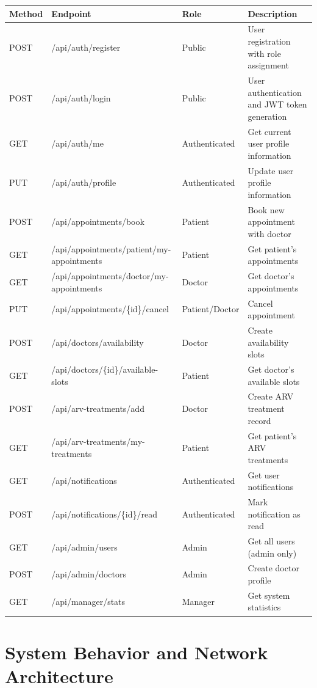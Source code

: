 \documentclass[12pt,a4paper]{article}
\begin{document}
\begin{longtable}{|l|l|l|p{6cm}|}
\hline
\textbf{Method} & \textbf{Endpoint} & \textbf{Role} & \textbf{Description} \\
\hline
POST & /api/auth/register & Public & User registration with role assignment \\
\hline
POST & /api/auth/login & Public & User authentication and JWT token generation \\
\hline
GET & /api/auth/me & Authenticated & Get current user profile information \\
\hline
PUT & /api/auth/profile & Authenticated & Update user profile information \\
\hline
POST & /api/appointments/book & Patient & Book new appointment with doctor \\
\hline
GET & /api/appointments/patient/my-appointments & Patient & Get patient's appointments \\
\hline
GET & /api/appointments/doctor/my-appointments & Doctor & Get doctor's appointments \\
\hline
PUT & /api/appointments/\{id\}/cancel & Patient/Doctor & Cancel appointment \\
\hline
POST & /api/doctors/availability & Doctor & Create availability slots \\
\hline
GET & /api/doctors/\{id\}/available-slots & Patient & Get doctor's available slots \\
\hline
POST & /api/arv-treatments/add & Doctor & Create ARV treatment record \\
\hline
GET & /api/arv-treatments/my-treatments & Patient & Get patient's ARV treatments \\
\hline
GET & /api/notifications & Authenticated & Get user notifications \\
\hline
POST & /api/notifications/\{id\}/read & Authenticated & Mark notification as read \\
\hline
GET & /api/admin/users & Admin & Get all users (admin only) \\
\hline
POST & /api/admin/doctors & Admin & Create doctor profile \\
\hline
GET & /api/manager/stats & Manager & Get system statistics \\
\hline
\end{longtable}

\section{System Behavior and Network Architecture}
\end{document}
